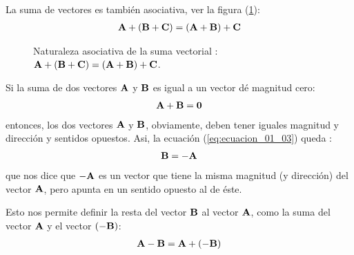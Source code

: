 \documentclass[12pt]{article}
\begin{document}
La suma de vectores es también asociativa, ver la figura (\ref{fig:figura_01_04}):
\begin{align*}
    \vb{A} + \left( \vb{B} + \vb{C} \right) = \left( \vb{A} + \vb{B} \right) + \vb{C}
\end{align*}
\begin{figure}[H]
    \centering
    \caption{Naturaleza asociativa de la suma vectorial : $\vb{A} + \left( \vb{B} + \vb{C} \right) = \left( \vb{A} + \vb{B} \right) + \vb{C}$.}
    \label{fig:figura_01_04}
\end{figure}
Si la suma de dos vectores $\vb{A}$ y $\vb{B}$ es igual a un vector dé magnitud cero:
\begin{align}
    \vb{A} + \vb{B} = \vb{0}
    \label{eq:ecuacion_01_03}
\end{align}
entonces, los dos vectores $\vb{A}$ y $\vb{B}$, obviamente, deben tener iguales magnitud y dirección y sentidos opuestos. Asi, la ecuación (\ref{eq:ecuacion_01_03}) queda :
\begin{align}
    \vb{B} = - \vb{A}
    \label{ec:ecuacion_01_04}
\end{align}
que nos dice que $- \vb{A}$ es un vector que tiene la misma magnitud (y dirección) del vector $\vb{A}$, pero apunta en un sentido opuesto al de éste. 
\par
Esto nos permite definir la resta del vector $\vb{B}$ al vector $\vb{A}$, como la suma del vector $\vb{A}$ y el vector $\left( - \vb{B} \right)$: 
\begin{align}
    \vb{A} - \vb{B} = \vb{A} + \left( - \vb{B} \right)
    \label{eq:ecuacion_01_05}
\end{align}
\end{document}
